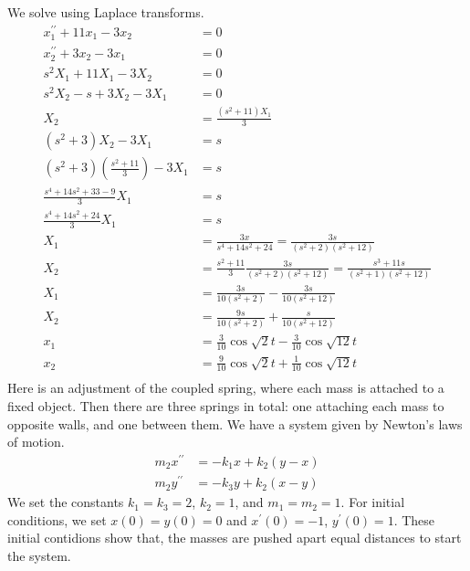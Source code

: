 \documentclass[fleqn,letterpaper]{report}
\begin{document}
We solve using Laplace transforms.
\begin{align*}
x_1^{\prime \prime} + 11 x_1 - 3x_2 & = 0 \\
x_2^{\prime \prime} + 3 x_2 - 3x_1 & = 0 \\
s^2 X_1 + 11 X_1 - 3X_2 & = 0 \\
s^2 X_2 - s + 3X_2 - 3X_1 & = 0 \\
X_2 & = \frac{(s^2+11) X_1}{3} \\
(s^2+3)X_2 - 3X_1 & = s \\
(s^2+3)\left( \frac{s^2+11}{3} \right) - 3X_1 & = s \\
\frac{s^4 + 14s^2+ 33 - 9}{3} X_1 & = s \\
\frac{s^4 + 14s^2 + 24}{3} X_1 & = s \\
X_1 & = \frac{3x}{s^4 + 14s^2 + 24} = \frac{3s}{(s^2+2)(s^2+12)}
\\
X_2 & = \frac{s^2+11}{3} \frac{3s}{(s^2+2)(s^2+12)} = \frac{s^3
+ 11s}{(s^2+1)(s^2+12)} \\
X_1 & = \frac{3s}{10(s^2+2)} - \frac{3s}{10(s^2+12)} \\
X_2 & = \frac{9s}{10(s^2+2)} + \frac{s}{10(s^2+12)} \\
x_1 & = \frac{3}{10} \cos \sqrt{2}t - \frac{3}{10} \cos \sqrt{12}
t \\
x_2 & = \frac{9}{10} \cos \sqrt{2}t + \frac{1}{10} \cos \sqrt{12}
t \\
\end{align*}
Here is an adjustment of the coupled spring, where each mass
is attached to a fixed object. Then there are three springs in
total: one attaching each mass to opposite walls, and one
between them. We have a system given by Newton's laws of
motion.
\begin{align*}
m_2 x^{\prime \prime} & = -k_1 x + k_2 (y-x) \\
m_2 y^{\prime \prime} & = -k_3 y + k_2 (x-y) 
\end{align*}
We set the constants $k_1 = k_3 = 2$, $k_2 = 1$, and $m_1 =
m_2 = 1$.  For initial conditions, we set $x(0) = y(0) = 0$
and $x^\prime(0) = -1$, $y^\prime(0) = 1$. These initial
contidions show that, the masses are pushed apart equal
distances to start the system. 
\end{document}
